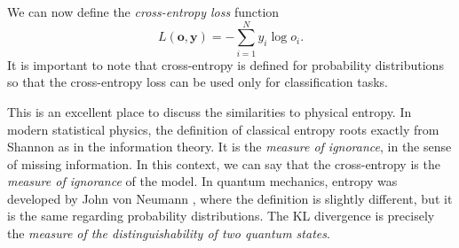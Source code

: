 We can now define the \emph{cross-entropy loss} function
\begin{equation}
    \label{eq:cross_entropy}
    L(\pmb{o},\pmb{y}) = - \sum_{i=1}^N y_i \log o_i.
\end{equation}
It is important to note that cross-entropy is defined for probability distributions so that the cross-entropy loss can be used only for classification tasks.

This is an excellent place to discuss the similarities to physical entropy.
In modern statistical physics, the definition of classical entropy roots exactly from Shannon \cite{shannon} as in the information theory.
It is the \emph{measure of ignorance}, in the sense of missing information.
In this context, we can say that the cross-entropy is the \emph{measure of ignorance} of the model.
In quantum mechanics, entropy was developed by John von Neumann \cite{VonNeumann}, where the definition is slightly different, but it is the same regarding probability distributions.
The KL divergence is precisely the \emph{measure of the distinguishability of two quantum states}.


